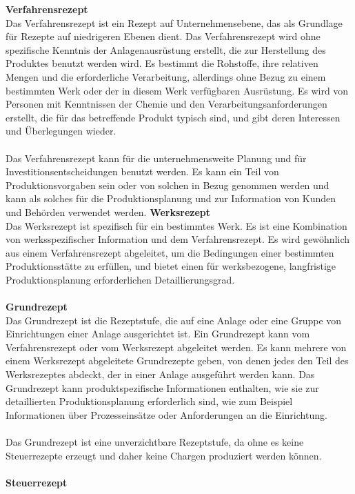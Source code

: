 \textbf{Verfahrensrezept}\\
Das Verfahrensrezept ist ein Rezept auf Unternehmensebene, das als Grundlage für Rezepte auf niedrigeren Ebenen dient. Das Verfahrensrezept wird ohne spezifische Kenntnis der Anlagenausrüstung erstellt, die zur Herstellung des Produktes benutzt werden wird. Es bestimmt die Rohstoffe, ihre relativen Mengen und die erforderliche Verarbeitung, allerdings ohne Bezug zu einem bestimmten Werk oder der in diesem Werk verfügbaren Ausrüstung. Es wird von Personen mit Kenntnissen der Chemie und den Verarbeitungsanforderungen erstellt, die für das betreffende Produkt typisch sind, und gibt deren Interessen und Überlegungen wieder.\\\\
Das Verfahrensrezept kann für die unternehmensweite Planung und für Investitionsentscheidungen benutzt werden. Es kann ein Teil von Produktionsvorgaben sein oder von solchen in Bezug genommen werden und kann als solches für die Produktionsplanung und zur Information von Kunden und Behörden verwendet werden.
\newpage
\textbf{Werksrezept}\\
Das Werksrezept ist spezifisch für ein bestimmtes Werk. Es ist eine Kombination von werksspezifischer Information und dem Verfahrensrezept. Es wird gewöhnlich aus einem Verfahrensrezept abgeleitet, um die Bedingungen einer bestimmten Produktionsstätte zu erfüllen, und bietet einen für werksbezogene, langfristige Produktionsplanung erforderlichen Detaillierungsgrad.
\\\\
\textbf{Grundrezept}\\
Das Grundrezept ist die Rezeptstufe, die auf eine Anlage oder eine Gruppe von Einrichtungen einer Anlage ausgerichtet ist. Ein Grundrezept kann vom Verfahrensrezept oder vom Werksrezept abgeleitet werden. Es kann mehrere von einem Werksrezept abgeleitete Grundrezepte geben, von denen jedes den Teil des Werksrezeptes abdeckt, der in einer Anlage ausgeführt werden kann. Das Grundrezept kann produktspezifische Informationen enthalten, wie sie zur detaillierten Produktionsplanung erforderlich sind, wie zum Beispiel Informationen über Prozesseinsätze oder Anforderungen an die Einrichtung.\\\\
Das Grundrezept ist eine unverzichtbare Rezeptstufe, da ohne es keine Steuerrezepte erzeugt und daher keine Chargen produziert werden können.
\\\\
\textbf{Steuerrezept}\\
